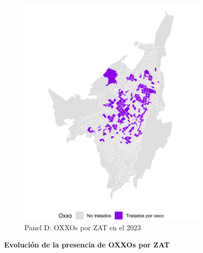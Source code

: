 \documentclass{article}
\begin{document}
\begin{figure} [H]
\begin{subfigure}[b]{0.4\textwidth}
        \includegraphics[width=\linewidth]{figs_oxxo_maps/mapa_oxxos_binary_2023.png}
        \caption{Panel D: OXXOs por ZAT en el 2023}
        \label{fig:panelD}
    \end{subfigure}
    
    \caption{
        \textbf{Evolución de la presencia de OXXOs por ZAT}
    }
    \label{fig:fourpanel}
\end{figure}
\end{document}
